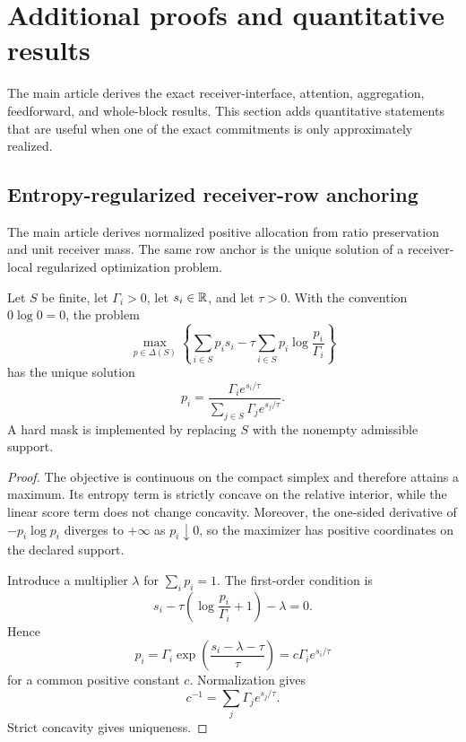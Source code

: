 \section{Additional proofs and quantitative results}\label{supp:proofs}

The main article derives the exact receiver-interface, attention, aggregation, feedforward, and whole-block results. This section adds quantitative statements that are useful when one of the exact commitments is only approximately realized.

\subsection{Entropy-regularized receiver-row anchoring}

The main article derives normalized positive allocation from ratio preservation and unit receiver mass. The same row anchor is the unique solution of a receiver-local regularized optimization problem.

\begin{proposition}\label{prop:supp-entropy-anchor}
Let $S$ be finite, let $\Gamma_i>0$, let $s_i\in\mathbb{R}$, and let $\tau>0$. With the convention $0\log 0=0$, the problem
\[
\max_{p\in\Delta(S)}
\left\{
\sum_{i\in S}p_is_i
-\tau\sum_{i\in S}p_i\log\frac{p_i}{\Gamma_i}
\right\}
\]
has the unique solution
\[
\boxed{
p_i
=
\frac{\Gamma_i e^{s_i/\tau}}
{\sum_{j\in S}\Gamma_j e^{s_j/\tau}}.
}
\]
A hard mask is implemented by replacing $S$ with the nonempty admissible support.
\end{proposition}

\begin{proof}
The objective is continuous on the compact simplex and therefore attains a maximum. Its entropy term is strictly concave on the relative interior, while the linear score term does not change concavity. Moreover, the one-sided derivative of $-p_i\log p_i$ diverges to $+\infty$ as $p_i\downarrow0$, so the maximizer has positive coordinates on the declared support.

Introduce a multiplier $\lambda$ for $\sum_i p_i=1$. The first-order condition is
\[
s_i
-\tau\left(\log\frac{p_i}{\Gamma_i}+1\right)
-\lambda
=0.
\]
Hence
\[
p_i
=
\Gamma_i
\exp\!\left(\frac{s_i-\lambda-\tau}{\tau}\right)
=
c\Gamma_i e^{s_i/\tau}
\]
for a common positive constant $c$. Normalization gives
\[
c^{-1}=\sum_j\Gamma_j e^{s_j/\tau}.
\]
Strict concavity gives uniqueness.
\end{proof}

